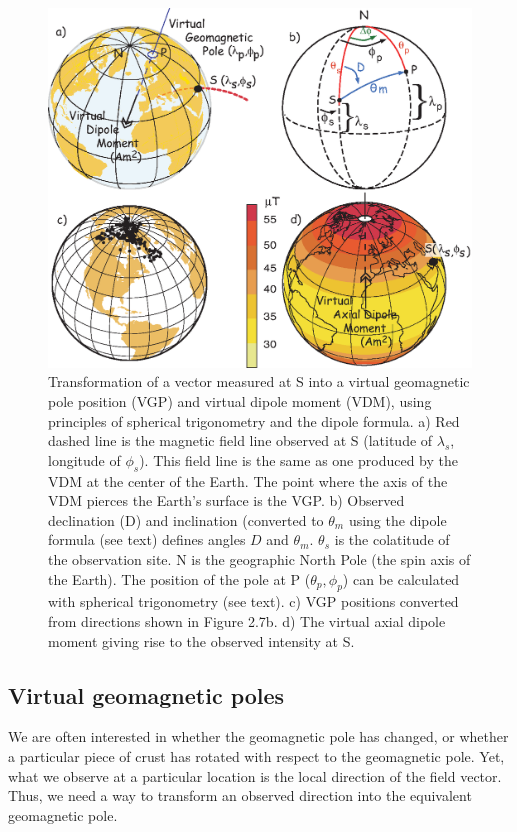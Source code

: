 \begin{figure}[!htb]
\centering  \includegraphics[width=13 cm]{EPSfiles/mkvgp.eps}
\caption {Transformation of a vector measured at S into a virtual
geomagnetic pole position (VGP) and virtual dipole moment (VDM),
using principles of spherical trigonometry and the dipole formula.  a) Red dashed line is the magnetic field line  observed at S (latitude of $\lambda_s$, longitude of $\phi_s$).  This field line is the  same as one produced by the VDM at the center of the Earth.  The point where the axis of the  VDM pierces the Earth's surface is the VGP.    b)  Observed declination (D) and inclination (converted to $\theta_m$ using the dipole formula (see text) defines angles $D$ and $\theta_m$.  $\theta_s$ is the colatitude of the observation site. N is the geographic North Pole (the spin axis of
the Earth). The position of the pole at P ($\theta_p,\phi_p$)  can be calculated with spherical trigonometry (see text).    c) VGP positions converted from directions shown in Figure 2.7b. d) The virtual axial dipole moment giving rise to the observed intensity at S.}
\label{fig:mkvgp}
\end{figure}

\subsection{Virtual geomagnetic poles}
\label{sect:vgp}

 We are often interested in
whether the geomagnetic pole has changed, or whether a particular piece of crust
has rotated with respect to the geomagnetic pole.  Yet, what we
observe at a particular location is the local direction of the field
vector.  Thus, we need a way to transform an observed direction into the
equivalent geomagnetic pole. 

